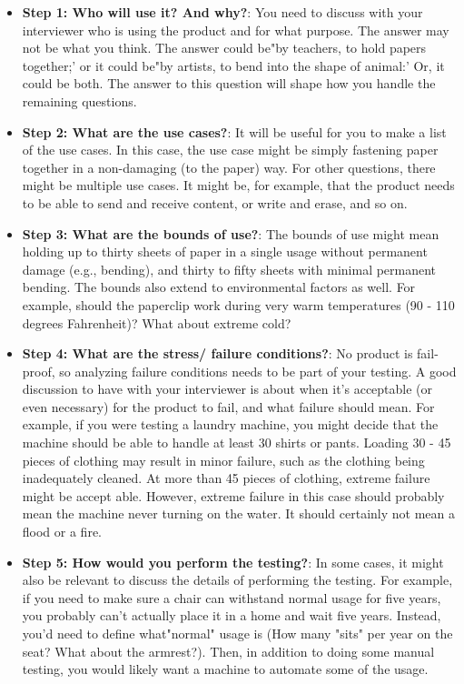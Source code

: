 \documentclass{report}
\begin{document}
\begin{itemize}
            \begin{itemize}
                \item \textbf{Step 1: Who will use it? And why?}: You need to discuss with your interviewer who is using the product and for what purpose. The answer may not be what you think. The answer could be"by teachers, to hold papers together;' or it could be"by artists, to bend into the shape of animal:' Or, it could be both. The answer to this question will shape how you handle the remaining questions.
                \item \textbf{Step 2: What are the use cases?}: It will be useful for you to make a list of the use cases. In this case, the use case might be simply fastening paper together in a non-damaging (to the paper) way. 
                    \bigbreak \noindent 
                    For other questions, there might be multiple use cases. It might be, for example, that the product needs to be able to send and receive content, or write and erase, and so on.
                \item \textbf{Step 3: What are the bounds of use?}: The bounds of use might mean holding up to thirty sheets of paper in a single usage without permanent damage (e.g., bending), and thirty to fifty sheets with minimal permanent bending. 
                    \bigbreak \noindent 
                    The bounds also extend to environmental factors as well. 
                    \bigbreak \noindent 
                    For example, should the paperclip work during very warm temperatures (90 - 110 degrees Fahrenheit)? What about extreme cold?
                \item \textbf{Step 4: What are the stress/ failure conditions?}: No product is fail-proof, so analyzing failure conditions needs to be part of your testing. A good discussion to have with your interviewer is about when it's acceptable (or even necessary) for the product to fail, and what failure should mean. For example, if you were testing a laundry machine, you might decide that the machine should be able to handle at least 30 shirts or pants. Loading 30 - 45 pieces of clothing may result in minor failure, such as the clothing being inadequately cleaned. At more than 45 pieces of clothing, extreme failure might be accept able. However, extreme failure in this case should probably mean the machine never turning on the water. It should certainly not mean a flood or a fire.
                \item \textbf{Step 5: How would you perform the testing?}: In some cases, it might also be relevant to discuss the details of performing the testing. For example, if you need to make sure a chair can withstand normal usage for five years, you probably can't actually place it in a home and wait five years. Instead, you'd need to define what"normal" usage is (How many "sits" per year on the seat? What about the armrest?). Then, in addition to doing some manual testing, you would likely want a machine to automate some of the usage.

\end{itemize}
\end{itemize}
\end{document}
